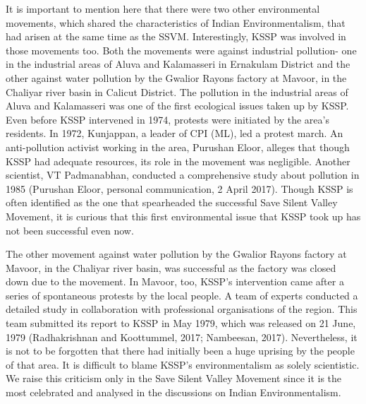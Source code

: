 \documentclass[twoside, 13pt]{article}
\begin{document}
{{\fontsize{12}{14}\selectfont
It is important to mention here that there were two other environmental movements, which shared the characteristics of Indian Environmentalism, that had arisen at the same time as the SSVM. Interestingly, KSSP was involved in those movements too. Both the movements were against industrial pollution- one in the industrial areas of Aluva and Kalamasseri in Ernakulam District and the other against water pollution by the Gwalior Rayons factory at Mavoor, in the Chaliyar river basin in Calicut District. The pollution in the industrial areas of Aluva and Kalamasseri was one of the first ecological issues taken up by KSSP. Even before KSSP intervened in 1974, protests were initiated by the area’s residents. In 1972, Kunjappan, a leader of CPI (ML), led a protest march. An anti-pollution activist working in the area, Purushan Eloor, alleges that though KSSP had adequate resources, its role in the movement was negligible. Another scientist, VT Padmanabhan, conducted a comprehensive study about pollution in 1985 (Purushan Eloor, personal communication, 2 April 2017). Though KSSP is often identified as the one that spearheaded the successful Save Silent Valley Movement, it is curious that this first environmental issue that KSSP took up has not been successful even now.

The other movement against water pollution by the Gwalior Rayons factory at Mavoor, in the Chaliyar river basin, was successful as the factory was closed down due to the movement. In Mavoor, too, KSSP’s intervention came after a series of spontaneous protests by the local people. A team of experts conducted a detailed study in collaboration with professional organisations of the region. This team submitted its report to KSSP in May 1979, which was released on 21 June, 1979 (Radhakrishnan and Koottummel, 2017; Nambeesan, 2017). Nevertheless, it is not to be forgotten that there had initially been a huge uprising by the people of that area. It is difficult to blame KSSP’s environmentalism as solely scientistic. We raise this criticism only in the Save Silent Valley Movement since it is the most celebrated and analysed in the discussions on Indian Environmentalism. }

}
\end{document}
